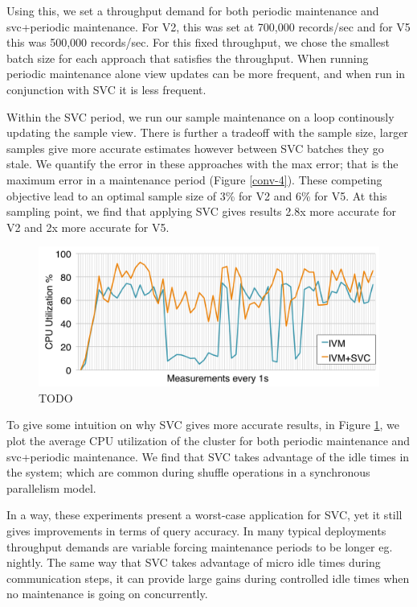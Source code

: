Using this, we set a throughput demand for both periodic maintenance and svc+periodic maintenance.
For V2, this was set at 700,000 records/sec and for V5 this was 500,000 records/sec.
For this fixed throughput, we chose the smallest batch size for each approach that satisfies the throughput.
When running periodic maintenance alone view updates can be more frequent, and when run in conjunction with SVC it is less frequent.

Within the SVC period, we run our sample maintenance on a loop continously updating the sample view.
There is further a tradeoff with the sample size, larger samples give more accurate estimates however between SVC batches they go stale.
We quantify the error in these approaches with the max error; that is the maximum error in a maintenance period (Figure \ref{conv-4}).
These competing objective lead to an optimal sample size of 3\% for V2 and 6\% for V5.
At this sampling point, we find that applying SVC gives results 2.8x more accurate for V2 and 2x more accurate for V5.

\begin{figure}[t]
\centering
\includegraphics[scale=0.14]{exp/con_7.pdf}
 \caption{TODO \label{conv-5}} 
\end{figure}
To give some intuition on why SVC gives more accurate results, in Figure \ref{conv-5}, we plot the average CPU utilization of the cluster for both periodic maintenance and svc+periodic maintenance. 
We find that SVC takes advantage of the idle times in the system; which are common during shuffle operations in a synchronous parallelism model.

In a way, these experiments present a worst-case application for SVC, yet it still gives improvements in terms of query accuracy.
In many typical deployments throughput demands are variable forcing maintenance periods to be longer eg. nightly.
The same way that SVC takes advantage of micro idle times during communication steps, it can provide large gains during controlled idle times when no maintenance is going on concurrently.


